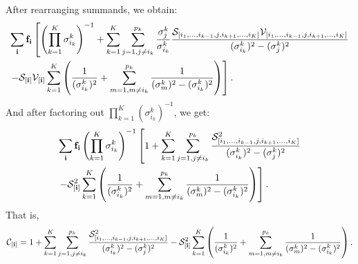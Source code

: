 After rearranging summands, we obtain:
\begin{align*}
  \begin{split}
    &\sum_{\bf i} \mathbf{f}_{\bf i}\left[ \left(\prod_{k=1}^K \sigma_{i_k}^k\right)^{-1} + \sum_{k=1}^K \sum_{j = 1, j\neq i_k}^{p_k} \frac{\sigma_j^k}{\sigma_{i_k}^k} \frac{\mathcal{S}_{[i_1,\ldots,i_{k-1},j,i_{k+1},\ldots,i_K]}\mathcal{V}_{[i_1,\ldots,i_{k-1},j,i_{k+1},\ldots,i_K]}}{(\sigma_{i_k}^k)^2 - (\sigma_{j}^k)^2} \right.\\
    &\left. - \mathcal{S}_{\bf [i]} \mathcal{V}_{\bf [i]}\sum_{k=1}^K\left( \frac{1}{(\sigma_{i_k}^k)^2} + \sum_{m=1,m\neq i_k}^{p_k}\frac{1}{(\sigma_m^k)^2 - (\sigma_{i_k}^k)^2}  \right)\right].
  \end{split}
\end{align*}
And after factoring out $\prod_{k=1}^K(\sigma_{i_k}^k)^{-1}$, we get:
\begin{align*}
  \begin{split}
    &\sum_{\bf i} \mathbf{f}_{\bf i}\left(\prod_{k=1}^K \sigma_{i_k}^k\right)^{-1}\left[ 1 + \sum_{k=1}^K \sum_{j = 1, j\neq i_k}^{p_k} \frac{\mathcal{S}_{[i_1,\ldots,i_{k-1},j,i_{k+1},\ldots,i_K]}^2}{(\sigma_{i_k}^k)^2 - (\sigma_{j}^k)^2} \right.\\
    &\left.-\mathcal{S}_{\bf [i]}^2\sum_{k=1}^K\left( \frac{1}{(\sigma_{i_k}^k)^2} + \sum_{m=1,m\neq i_k}^{p_k}\frac{1}{(\sigma_m^k)^2 - (\sigma_{i_k}^k)^2}  \right)\right].
  \end{split}
\end{align*}
That is,
\begin{align}
  \label{equation:better.c}
  \mathcal{C}_{[{\bf i}]} =  1 + \sum_{k=1}^K \sum_{j = 1, j\neq i_k}^{p_k} \frac{\mathcal{S}_{[i_1,\ldots,i_{k-1},j,i_{k+1},\ldots,i_K]}^2}{(\sigma_{i_k}^k)^2 - (\sigma_{j}^k)^2} - \mathcal{S}_{\bf [i]}^2\sum_{k=1}^K\left( \frac{1}{(\sigma_{i_k}^k)^2} + \sum_{m=1,m\neq i_k}^{p_k}\frac{1}{(\sigma_m^k)^2 - (\sigma_{i_k}^k)^2}  \right).
\end{align}

